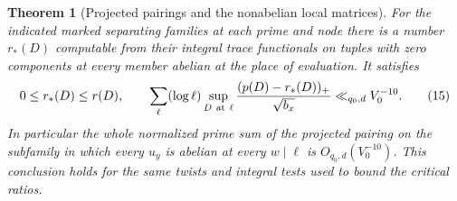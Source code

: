 \documentclass[a4paper,11pt]{article}
\newtheorem{theorem}[proposition]{Theorem}
\theoremstyle{definition}
\theoremstyle{remark}
\numberwithin{equation}{section}
\begin{document}
\begin{theorem}[Projected pairings and the nonabelian local matrices]
\leavevmode\label{thm:abelianperiod744}
For the indicated marked separating families at each prime and
node there is a number \(r_*(D)\) computable from their integral
trace functionals on tuples with zero components at every member
abelian at the place of evaluation. It satisfies
\[
  0\le r_*(D)\le r(D),\qquad
  \sum_\ell(\log\ell)\sup_{D\ {\rm at}\ \ell}
          \frac{(p(D)-r_*(D))_+}{\sqrt{b_x}}
                      \ll_{q_0,d} V_0^{-10}.
 \tag{15}\label{eq:abelianperiod744}
\]
In particular the whole normalized prime sum of the projected
pairing on the subfamily in which every \(u_y\) is abelian at
every \(w\mid\ell\) is \(O_{q_0,d}(V_0^{-10})\). This conclusion
holds for the same twists and integral tests used to bound the
critical ratios.
\end{theorem}
\end{document}
